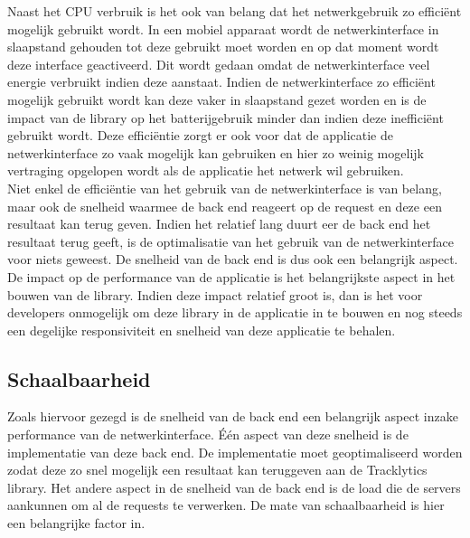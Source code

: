 \noindent Naast het CPU verbruik is het ook van belang dat het netwerkgebruik zo effici\"ent mogelijk gebruikt wordt. In een mobiel apparaat wordt de netwerkinterface in slaapstand gehouden tot deze gebruikt moet worden en op dat moment wordt deze interface geactiveerd. Dit wordt gedaan omdat de netwerkinterface veel energie verbruikt indien deze aanstaat. Indien de netwerkinterface zo effici\"ent mogelijk gebruikt wordt kan deze vaker in slaapstand gezet worden en is de impact van de library op het batterijgebruik minder dan indien deze ineffici\"ent gebruikt wordt. Deze effici\"entie zorgt er ook voor dat de applicatie de netwerkinterface zo vaak mogelijk kan gebruiken en hier zo weinig mogelijk vertraging opgelopen wordt als de applicatie het netwerk wil gebruiken. \\

\noindent Niet enkel de effici\"entie van het gebruik van de netwerkinterface is van belang, maar ook de snelheid waarmee de back end reageert op de request en deze een resultaat kan terug geven. Indien het relatief lang duurt eer de back end het resultaat terug geeft, is de optimalisatie van het gebruik van de netwerkinterface voor niets geweest. De snelheid van de back end is dus ook een belangrijk aspect. \\

\noindent De impact op de performance van de applicatie is het belangrijkste aspect in het bouwen van de library. Indien deze impact relatief groot is, dan is het voor developers onmogelijk om deze library in de applicatie in te bouwen en nog steeds een degelijke responsiviteit en snelheid van deze applicatie te behalen. 

\subsection{Schaalbaarheid}
Zoals hiervoor gezegd is de snelheid van de back end een belangrijk aspect inzake performance van de netwerkinterface. \'E\'en aspect van deze snelheid is de implementatie van deze back end. De implementatie moet geoptimaliseerd worden zodat deze zo snel mogelijk een resultaat kan teruggeven aan de Tracklytics library. Het andere aspect in de snelheid van de back end is de load die de servers aankunnen om al de requests te verwerken. De mate van schaalbaarheid is hier een belangrijke factor in. \\

